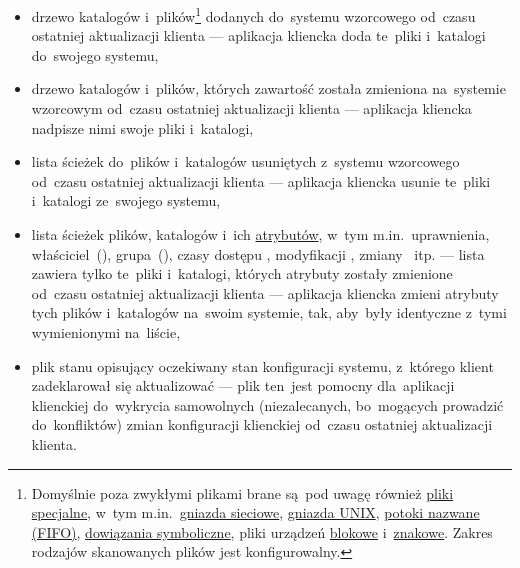 \documentclass[thesis]{subfiles}
\begin{document}
\begin{itemize}
	\item drzewo katalogów i~plików\footnote{Domyślnie poza zwykłymi plikami brane są~pod uwagę również \href{https://en.wikipedia.org/wiki/Unix_file_types}{pliki specjalne}, w~tym m.in.~\href{https://en.wikipedia.org/wiki/Network_socket}{gniazda sieciowe}, \href{https://en.wikipedia.org/wiki/Unix_domain_socket}{gniazda UNIX}, \href{https://en.wikipedia.org/wiki/Named_pipe}{potoki nazwane (FIFO)}, \href{https://en.wikipedia.org/wiki/Symbolic_link}{dowiązania symboliczne}, pliki urządzeń \href{https://en.wikipedia.org/wiki/Device_file\#Block_devices}{blokowe} i~\href{https://en.wikipedia.org/wiki/Device_file\#Character_devices}{znakowe}. Zakres rodzajów skanowanych plików jest konfigurowalny.} dodanych do~systemu wzorcowego od~czasu ostatniej aktualizacji klienta --- aplikacja kliencka doda te~pliki i~katalogi do~swojego systemu,
	\item drzewo katalogów i~plików, których zawartość została zmieniona na~systemie wzorcowym od~czasu ostatniej aktualizacji klienta --- aplikacja kliencka nadpisze nimi swoje pliki i~katalogi,
	\item lista ścieżek do~plików i~katalogów usuniętych z~systemu wzorcowego od~czasu ostatniej aktualizacji klienta --- aplikacja kliencka usunie te~pliki i~katalogi ze~swojego systemu,
	\item lista ścieżek plików, katalogów i~ich \href{https://serverfault.com/a/584102/289017}{atrybutów}, w~tym m.in.~uprawnienia, właściciel~(), grupa~(), czasy dostępu , modyfikacji , zmiany ~itp. --- lista zawiera tylko te~pliki i~katalogi, których atrybuty zostały zmienione od~czasu ostatniej aktualizacji klienta --- aplikacja kliencka zmieni atrybuty tych plików i~katalogów na~swoim systemie, tak, aby~były identyczne z~tymi wymienionymi na~liście,
	\item plik stanu opisujący oczekiwany stan konfiguracji systemu, z~którego klient zadeklarował się aktualizować --- plik ten~jest pomocny dla~aplikacji klienckiej do~wykrycia samowolnych (niezalecanych, bo~mogących prowadzić do~konfliktów) zmian konfiguracji klienckiej od~czasu ostatniej aktualizacji klienta.
\end{itemize}
\end{document}
